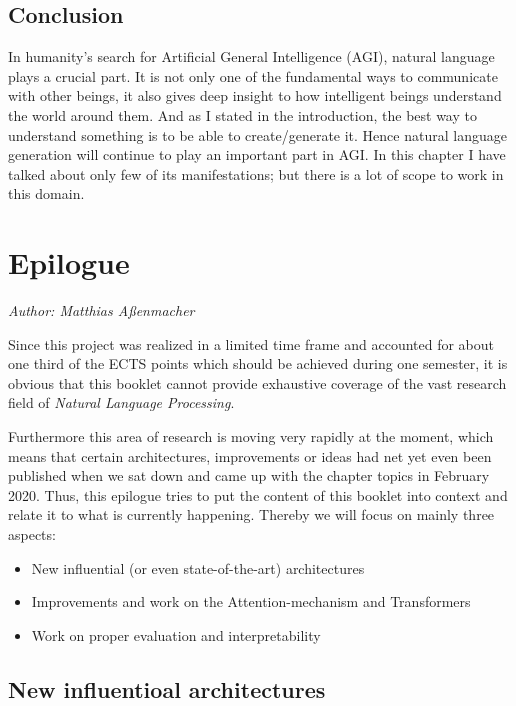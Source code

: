 \documentclass[]{krantz}
\providecommand{\tightlist}{%
  \setlength{\itemsep}{0pt}\setlength{\parskip}{0pt}}
\begin{document}
\hypertarget{conclusion}{%
\section{Conclusion}\label{conclusion}}

In humanity's search for Artificial General Intelligence (AGI), natural language plays a crucial part. It is not only one of the fundamental ways to communicate with other beings, it also gives deep insight to how intelligent beings understand the world around them. And as I stated in the introduction, the best way to understand something is to be able to create/generate it. Hence natural language generation will continue to play an important part in AGI. In this chapter I have talked about only few of its manifestations; but there is a lot of scope to work in this domain.

\hypertarget{epilogue}{%
\chapter{Epilogue}\label{epilogue}}

\emph{Author: Matthias Aßenmacher}

Since this project was realized in a limited time frame and accounted for about one third
of the ECTS points which should be achieved during one semester, it is obvious that this
booklet cannot provide exhaustive coverage of the vast research field of \emph{Natural Language Processing}.

Furthermore this area of research is moving very rapidly at the moment, which means that
certain architectures, improvements or ideas had net yet even been published when we sat down
and came up with the chapter topics in February 2020. Thus, this epilogue tries to put the content
of this booklet into context and relate it to what is currently happening. Thereby we will focus on
mainly three aspects:

\begin{itemize}
\tightlist
\item
  New influential (or even state-of-the-art) architectures
\item
  Improvements and work on the Attention-mechanism and Transformers
\item
  Work on proper evaluation and interpretability
\end{itemize}

\hypertarget{new-influentioal-architectures}{%
\section{New influentioal architectures}\label{new-influentioal-architectures}}
\end{document}
